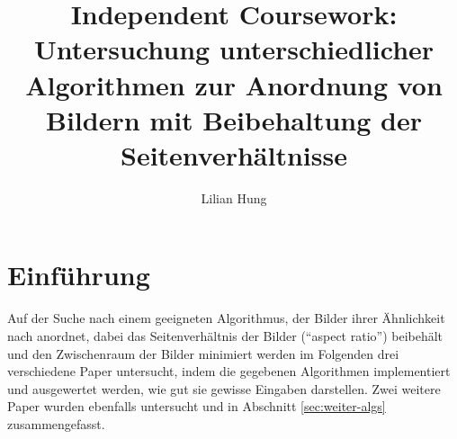 \documentclass[12pt, ngerman, utf8]{article}
\begin{document}
\title{Independent Coursework:\\Untersuchung unterschiedlicher Algorithmen zur Anordnung von Bildern mit Beibehaltung der Seitenverhältnisse}
\author{Lilian Hung}

\maketitle

\newpage

\tableofcontents 

\lstlistoflistings

\newpage



\section{Einführung}
Auf der Suche nach einem geeigneten Algorithmus, der Bilder ihrer Ähnlichkeit nach anordnet, dabei das Seitenverhältnis der Bilder (``aspect ratio'') beibehält und den Zwischenraum der Bilder minimiert werden im Folgenden drei verschiedene Paper untersucht, indem die gegebenen Algorithmen implementiert und ausgewertet werden, wie gut sie gewisse Eingaben darstellen. Zwei weitere Paper wurden ebenfalls untersucht und in Abschnitt \ref{sec:weiter-algs} zusammengefasst.
\end{document}
